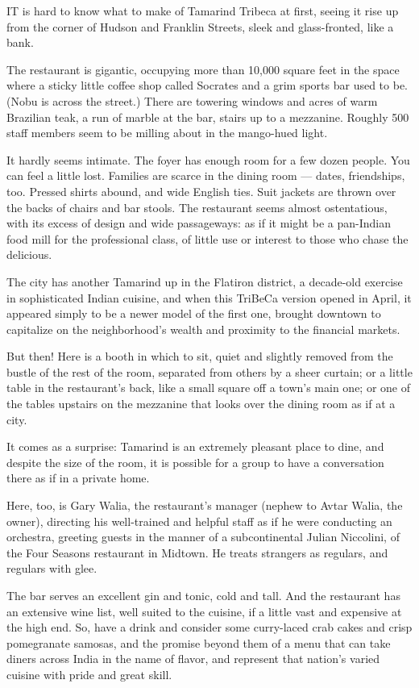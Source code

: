 IT is hard to know what to make of Tamarind Tribeca at first, seeing it
rise up from the corner of Hudson and Franklin Streets, sleek and
glass-fronted, like a bank.

The restaurant is gigantic, occupying more than 10,000 square feet in
the space where a sticky little coffee shop called Socrates and a grim
sports bar used to be. (Nobu is across the street.) There are towering
windows and acres of warm Brazilian teak, a run of marble at the bar,
stairs up to a mezzanine. Roughly 500 staff members seem to be milling
about in the mango-hued light.

It hardly seems intimate. The foyer has enough room for a few dozen
people. You can feel a little lost. Families are scarce in the dining
room --- dates, friendships, too. Pressed shirts abound, and wide
English ties. Suit jackets are thrown over the backs of chairs and bar
stools. The restaurant seems almost ostentatious, with its excess of
design and wide passageways: as if it might be a pan-Indian food mill
for the professional class, of little use or interest to those who chase
the delicious.

The city has another Tamarind up in the Flatiron district, a decade-old
exercise in sophisticated Indian cuisine, and when this TriBeCa version
opened in April, it appeared simply to be a newer model of the first
one, brought downtown to capitalize on the neighborhood's wealth and
proximity to the financial markets.

But then! Here is a booth in which to sit, quiet and slightly removed
from the bustle of the rest of the room, separated from others by a
sheer curtain; or a little table in the restaurant's back, like a small
square off a town's main one; or one of the tables upstairs on the
mezzanine that looks over the dining room as if at a city.

It comes as a surprise: Tamarind is an extremely pleasant place to dine,
and despite the size of the room, it is possible for a group to have a
conversation there as if in a private home.

Here, too, is Gary Walia, the restaurant's manager (nephew to Avtar
Walia, the owner), directing his well-trained and helpful staff as if he
were conducting an orchestra, greeting guests in the manner of a
subcontinental Julian Niccolini, of the Four Seasons restaurant in
Midtown. He treats strangers as regulars, and regulars with glee.

The bar serves an excellent gin and tonic, cold and tall. And the
restaurant has an extensive wine list, well suited to the cuisine, if a
little vast and expensive at the high end. So, have a drink and consider
some curry-laced crab cakes and crisp pomegranate samosas, and the
promise beyond them of a menu that can take diners across India in the
name of flavor, and represent that nation's varied cuisine with pride
and great skill.

